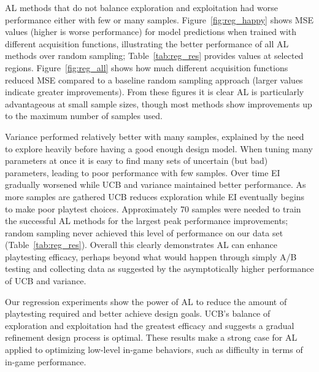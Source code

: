 \documentclass{sig-alternate}
\begin{document}
AL methods that do not balance exploration and exploitation had worse performance either with few or many samples.
Figure~\ref{fig:reg_happy} shows MSE values (higher is worse performance) for model predictions when trained with different acquisition functions, illustrating the better performance of all AL methods over random sampling; Table~\ref{tab:reg_res} provides values at selected regions.
Figure~\ref{fig:reg_all} shows how much different acquisition functions reduced MSE compared to a baseline random sampling approach (larger values indicate greater improvements).
From these figures it is clear AL is particularly advantageous at small sample sizes, though most methods show improvements up to the maximum number of samples used.


Variance performed relatively better with many samples, explained by the need to explore heavily before having a good enough design model.
When tuning many parameters at once it is easy to find many sets of uncertain (but bad) parameters, leading to poor performance with few samples.
Over time EI gradually worsened while UCB and variance maintained better performance.
As more samples are gathered UCB reduces exploration while EI eventually begins to make poor playtest choices.
Approximately 70 samples were needed to train the successful AL methods for the largest peak performance improvements; random sampling never achieved this level of performance on our data set (Table~\ref{tab:reg_res}).
Overall this clearly demonstrates AL can enhance playtesting efficacy, perhaps beyond what would happen through simply A/B testing and collecting data as suggested by the asymptotically higher performance of UCB and variance.

Our regression experiments show the power of AL to reduce the amount of playtesting required and better achieve design goals.
UCB's balance of exploration and exploitation had the greatest efficacy and suggests a gradual refinement design process is optimal.
These results make a strong case for AL applied to optimizing low-level in-game behaviors, such as difficulty in terms of in-game performance.
\end{document}
